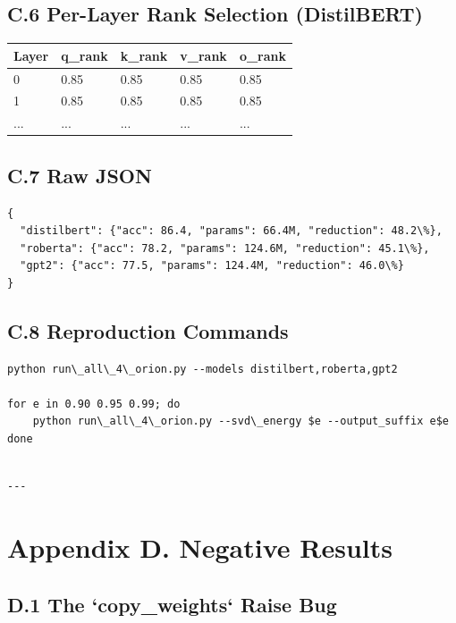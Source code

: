 \subsection{C.6 Per-Layer Rank Selection (DistilBERT)}

\begin{table}[H]
\centering
\small
\begin{tabular}{lllll}
\toprule
\textbf{Layer} & \textbf{q\_rank} & \textbf{k\_rank} & \textbf{v\_rank} & \textbf{o\_rank} \\
\midrule
0 & 0.85 & 0.85 & 0.85 & 0.85 \\
1 & 0.85 & 0.85 & 0.85 & 0.85 \\
... & ... & ... & ... & ... \\
\bottomrule
\end{tabular}
\end{table}

\subsection{C.7 Raw JSON}

\begin{lstlisting}
{
  "distilbert": {"acc": 86.4, "params": 66.4M, "reduction": 48.2\%},
  "roberta": {"acc": 78.2, "params": 124.6M, "reduction": 45.1\%},
  "gpt2": {"acc": 77.5, "params": 124.4M, "reduction": 46.0\%}
}
\end{lstlisting}

\subsection{C.8 Reproduction Commands}

\begin{lstlisting}
python run\_all\_4\_orion.py --models distilbert,roberta,gpt2

for e in 0.90 0.95 0.99; do
    python run\_all\_4\_orion.py --svd\_energy $e --output_suffix e$e
done
\end{lstlisting}
\begin{lstlisting}

---
\end{lstlisting}


\section{Appendix D. Negative Results}

\subsection{D.1 The `copy\_weights` Raise Bug}


